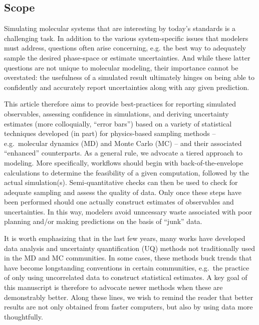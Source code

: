 \subsection{Scope}

Simulating molecular systems that are interesting by today's standards is a challenging task.  In addition to the various system-specific issues that modelers must address, questions often arise concerning, e.g. the best way to adequately sample the desired phase-space or estimate uncertainties.  And while these latter questions are not unique to molecular modeling, their importance cannot be overstated: the usefulness of a simulated result ultimately hinges on being able to confidently and accurately report uncertainties along with any given prediction.  

This article therefore aims to provide best-practices for reporting simulated observables, assessing confidence in simulations, and deriving uncertainty estimates (more colloquially, ``error bars'') based on a variety of statistical techniques developed (in part) for physics-based sampling methods -- e.g.\ molecular dynamics (MD) and Monte Carlo (MC) -- and their associated ``enhanced'' counterparts.  As a general rule, we advocate a tiered approach to modeling.  More specifically, workflows should begin with back-of-the-envelope calculations to determine the feasibility of a given computation, followed by the actual simulation(s).  Semi-quantitative checks can then be used to check for adequate sampling and assess the quality of data.  Only once these steps have been performed should one actually construct estimates of observables and uncertainties.  In this way, modelers avoid unncessary waste associated with poor planning and/or making predictions on the basis of ``junk'' data.

It is worth emphasizing that in the last few years, many works have developed data analysis and uncertainty quantification (UQ) methods not traditionally used in the MD and MC communities.  In some cases, these methods buck trends that have become longstanding conventions in certain communities, e.g.\ the practice of only using uncorrelated data to construct statistical estimates.  A key goal of this manuscript is therefore to advocate newer methods when these are demonstrably better.  Along these lines, we wish to remind the reader that better results are not only obtained from faster computers, but also by using data more thoughtfully.   

